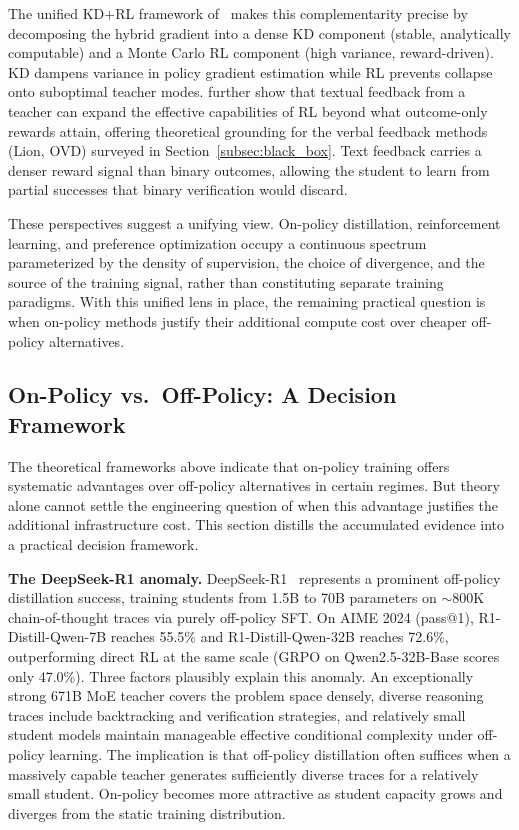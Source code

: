 \documentclass{article} %
\begin{document}
The unified KD+RL framework of~\citet{2512.23097} makes this complementarity precise by decomposing the hybrid gradient into a dense KD component (stable, analytically computable) and a Monte Carlo RL component (high variance, reward-driven). KD dampens variance in policy gradient estimation while RL prevents collapse onto suboptimal teacher modes. \citet{2602.02482} further show that textual feedback from a teacher can expand the effective capabilities of RL beyond what outcome-only rewards attain, offering theoretical grounding for the verbal feedback methods (Lion, OVD) surveyed in Section~\ref{subsec:black_box}. Text feedback carries a denser reward signal than binary outcomes, allowing the student to learn from partial successes that binary verification would discard.

These perspectives suggest a unifying view. On-policy distillation, reinforcement learning, and preference optimization occupy a continuous spectrum parameterized by the density of supervision, the choice of divergence, and the source of the training signal, rather than constituting separate training paradigms. With this unified lens in place, the remaining practical question is when on-policy methods justify their additional compute cost over cheaper off-policy alternatives.

\subsection{On-Policy vs.\ Off-Policy: A Decision Framework}
\label{subsec:on_vs_off}

The theoretical frameworks above indicate that on-policy training offers systematic advantages over off-policy alternatives in certain regimes. But theory alone cannot settle the engineering question of when this advantage justifies the additional infrastructure cost. This section distills the accumulated evidence into a practical decision framework.

\textbf{The DeepSeek-R1 anomaly.} DeepSeek-R1~\citep{2501.12948} represents a prominent off-policy distillation success, training students from 1.5B to 70B parameters on $\sim$800K chain-of-thought traces via purely off-policy SFT. On AIME 2024 (pass@1), R1-Distill-Qwen-7B reaches 55.5\% and R1-Distill-Qwen-32B reaches 72.6\%, outperforming direct RL at the same scale (GRPO on Qwen2.5-32B-Base scores only 47.0\%). Three factors plausibly explain this anomaly. An exceptionally strong 671B MoE teacher covers the problem space densely, diverse reasoning traces include backtracking and verification strategies, and relatively small student models maintain manageable effective conditional complexity under off-policy learning. The implication is that off-policy distillation often suffices when a massively capable teacher generates sufficiently diverse traces for a relatively small student. On-policy becomes more attractive as student capacity grows and diverges from the static training distribution.
\end{document}
